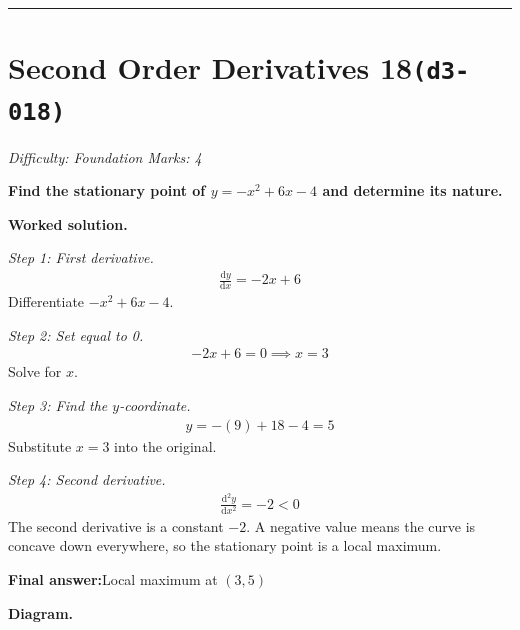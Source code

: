 \documentclass[11pt]{article}
\newcommand{\question}[1]{\par\medskip\noindent\textbf{#1}\par}
\begin{document}
\medskip\hrule

\section*{Second Order Derivatives 18\quad\small\texttt{(d3-018)}}
\textit{Difficulty: Foundation \quad\textbar\quad Marks: 4}

\question{Find the stationary point of \( y = -x^2 + 6x - 4 \) and determine its nature.}

\textbf{Worked solution.}

\textit{Step 1: First derivative.}
\[\begin{gathered}
\frac{\mathrm{d}y}{\mathrm{d}x} = -2x + 6
\end{gathered}\]
Differentiate \(-x^2 + 6x - 4\).

\textit{Step 2: Set equal to 0.}
\[\begin{gathered}
-2x + 6 = 0 \implies x = 3
\end{gathered}\]
Solve for \( x \).

\textit{Step 3: Find the \( y \)-coordinate.}
\[\begin{gathered}
y = -(9) + 18 - 4 = 5
\end{gathered}\]
Substitute \( x = 3 \) into the original.

\textit{Step 4: Second derivative.}
\[\begin{gathered}
\frac{\mathrm{d}^2y}{\mathrm{d}x^2} = -2 < 0
\end{gathered}\]
The second derivative is a constant \(-2\). A negative value means the curve is concave down everywhere, so the stationary point is a local maximum.

\begin{answerbox}
\textbf{Final answer:}\quad Local maximum at \(\displaystyle  (3, 5) \)
\end{answerbox}
\textbf{Diagram.}
\end{document}
